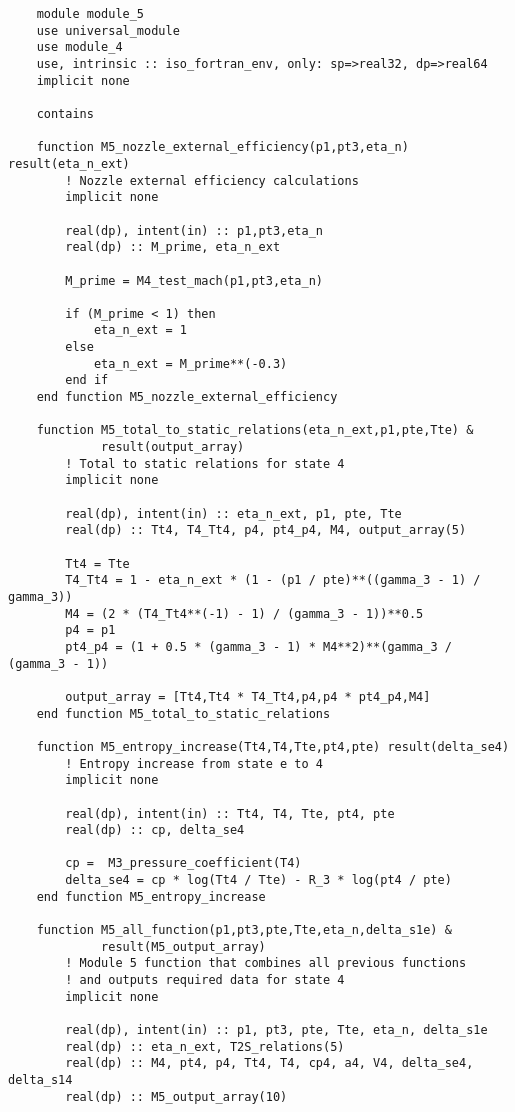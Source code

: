 \begin{verbatim}
    module module_5
    use universal_module
    use module_4
    use, intrinsic :: iso_fortran_env, only: sp=>real32, dp=>real64
    implicit none

    contains

    function M5_nozzle_external_efficiency(p1,pt3,eta_n) result(eta_n_ext)
        ! Nozzle external efficiency calculations
        implicit none

        real(dp), intent(in) :: p1,pt3,eta_n
        real(dp) :: M_prime, eta_n_ext

        M_prime = M4_test_mach(p1,pt3,eta_n)

        if (M_prime < 1) then
            eta_n_ext = 1
        else
            eta_n_ext = M_prime**(-0.3)
        end if
    end function M5_nozzle_external_efficiency

    function M5_total_to_static_relations(eta_n_ext,p1,pte,Tte) &
             result(output_array)
        ! Total to static relations for state 4
        implicit none

        real(dp), intent(in) :: eta_n_ext, p1, pte, Tte
        real(dp) :: Tt4, T4_Tt4, p4, pt4_p4, M4, output_array(5)

        Tt4 = Tte
        T4_Tt4 = 1 - eta_n_ext * (1 - (p1 / pte)**((gamma_3 - 1) / gamma_3))
        M4 = (2 * (T4_Tt4**(-1) - 1) / (gamma_3 - 1))**0.5
        p4 = p1
        pt4_p4 = (1 + 0.5 * (gamma_3 - 1) * M4**2)**(gamma_3 / (gamma_3 - 1))

        output_array = [Tt4,Tt4 * T4_Tt4,p4,p4 * pt4_p4,M4]
    end function M5_total_to_static_relations

    function M5_entropy_increase(Tt4,T4,Tte,pt4,pte) result(delta_se4)
        ! Entropy increase from state e to 4
        implicit none

        real(dp), intent(in) :: Tt4, T4, Tte, pt4, pte
        real(dp) :: cp, delta_se4

        cp =  M3_pressure_coefficient(T4)
        delta_se4 = cp * log(Tt4 / Tte) - R_3 * log(pt4 / pte)
    end function M5_entropy_increase

    function M5_all_function(p1,pt3,pte,Tte,eta_n,delta_s1e) &
             result(M5_output_array)
        ! Module 5 function that combines all previous functions
        ! and outputs required data for state 4
        implicit none

        real(dp), intent(in) :: p1, pt3, pte, Tte, eta_n, delta_s1e
        real(dp) :: eta_n_ext, T2S_relations(5)
        real(dp) :: M4, pt4, p4, Tt4, T4, cp4, a4, V4, delta_se4, delta_s14
        real(dp) :: M5_output_array(10)


\end{verbatim}
